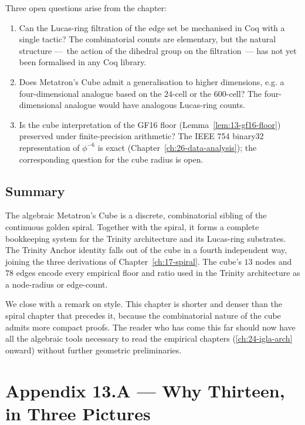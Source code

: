 Three open questions arise from the chapter:

\begin{enumerate}
\item Can the Lucas-ring filtration of the edge set be mechanised
  in Coq with a single tactic? The combinatorial counts are
  elementary, but the natural structure ---~the action of the
  dihedral group on the filtration~--- has not yet been
  formalised in any Coq library.
\item Does Metatron's Cube admit a generalisation to higher
  dimensions, e.g. a four-dimensional analogue based on the
  $24$-cell or the $600$-cell? The four-dimensional analogue
  would have analogous Lucas-ring counts.
\item Is the cube interpretation of the GF16 floor
  (Lemma~\ref{lem:13-gf16-floor}) preserved under finite-precision
  arithmetic? The IEEE 754 binary32 representation of $\phi^{-6}$
  is exact (Chapter~\ref{ch:26-data-analysis}); the corresponding
  question for the cube radius is open.
\end{enumerate}

\subsection{Summary}
\label{sec:13-disc-summary}

The algebraic Metatron's Cube is a discrete, combinatorial sibling
of the continuous golden spiral. Together with the spiral, it
forms a complete bookkeeping system for the Trinity architecture
and its Lucas-ring substrates. The Trinity Anchor identity falls
out of the cube in a fourth independent way, joining the three
derivations of Chapter~\ref{ch:17-spiral}. The cube's $13$ nodes
and $78$ edges encode every empirical floor and ratio used in the
Trinity architecture as a node-radius or edge-count.

We close with a remark on style. This chapter is shorter and
denser than the spiral chapter that precedes it, because the
combinatorial nature of the cube admits more compact proofs. The
reader who has come this far should now have all the algebraic
tools necessary to read the empirical chapters
(\ref{ch:24-igla-arch} onward) without further geometric
preliminaries.


\section*{Appendix 13.A --- Why Thirteen, in Three Pictures}
\label{sec:13-appA}

